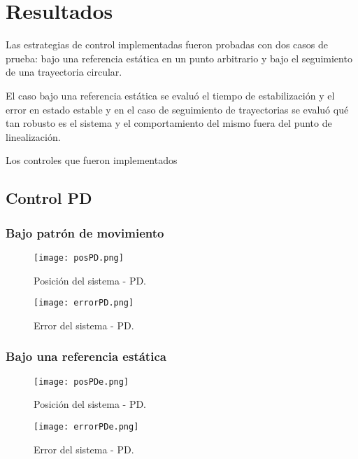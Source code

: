 
\section{Resultados}

Las estrategias de control implementadas fueron probadas con dos casos de prueba: bajo una referencia estática en un punto arbitrario y bajo el seguimiento de una trayectoria circular.

El caso bajo una referencia estática se evaluó el tiempo de estabilización y el error en estado estable y en el caso de seguimiento de trayectorias se evaluó qué tan robusto es el sistema y el comportamiento del mismo fuera del punto de linealización.

Los controles que fueron implementados 
\subsection{Control PD}

\subsubsection{Bajo patrón de movimiento}
\begin{figure}[h]
    \centering
    \texttt{[image: posPD.png]}
    \caption{Posición del sistema - PD.}
    \label{fig:PD position}
\end{figure}

\begin{figure}[h]
    \centering
    \texttt{[image: errorPD.png]}
    \caption{Error del sistema - PD.}
    \label{fig:PD error}
\end{figure}

\subsubsection{Bajo una referencia estática}

\begin{figure}[htb]
    \centering
    \texttt{[image: posPDe.png]}
    \caption{Posición del sistema - PD.}
    \label{fig:PD position}
\end{figure}

\begin{figure}[htb]
    \centering
    \texttt{[image: errorPDe.png]}
    \caption{Error del sistema - PD.}
    \label{fig:PD error}
\end{figure}


